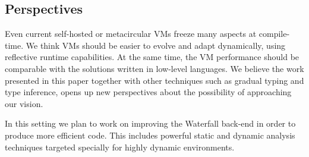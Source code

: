 \documentclass[10pt,preprint,letter]{sigplanconf}
\newcommand{\W}{Waterfall\xspace}
\begin{document}
 \subsection{Perspectives}


Even current self-hosted or metacircular VMs freeze many aspects at compile-time.
We think VMs should be easier to evolve and adapt dynamically, using reflective runtime capabilities.  
At the same time, the VM performance should be comparable with the solutions written in low-level languages. 
We believe the work presented in this paper together with other techniques such as gradual typing and type inference, opens up new perspectives about the possibility of approaching our vision.

In this setting we plan to work on improving the \W back-end in order to produce more efficient code. This includes powerful static and dynamic analysis techniques targeted specially for highly dynamic environments. 
 















\end{document}
